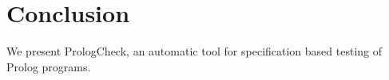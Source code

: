 \documentclass[runningheads,a4paper]{../../PaperStyles/llncs}
\newcommand{\Prolog}[0]{{\sf Prolog}}
\newcommand{\plqc}[0]{{\sf PrologCheck}}
\begin{document}







\section{Conclusion}
\label{sec:conclusion}



We present \plqc{}, an automatic tool for specification based
testing of \Prolog{} programs.
%
\end{document}
